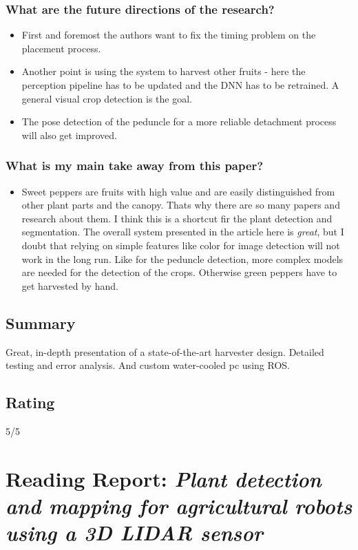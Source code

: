     \subsubsection*{What are the future directions of the research?}
    \begin{itemize}
        \item First and foremost the authors want to fix the timing problem on the placement process.
        \item Another point is using the system to harvest other fruits - here the perception pipeline has to be updated and the DNN has to be retrained. A general visual crop detection is the goal.
        \item The pose detection of the peduncle for a more reliable detachment process will also get improved.
    \end{itemize}
    \subsubsection*{What is my main take away from this paper?}
    \begin{itemize}
        \item Sweet peppers are fruits with high value and are easily distinguished from other plant parts and the canopy. Thats why there are so many papers and research about them. I think this is a shortcut fir the plant detection and segmentation. The overall system presented in the article here is \emph{great}, but I doubt that relying on simple features like color for image detection will not work in the long run. Like for the peduncle detection, more complex models are needed for the detection of the crops. Otherwise green peppers have to get harvested by hand.
    \end{itemize}
    
    \subsection*{Summary}
    Great, in-depth presentation of a state-of-the-art harvester design. Detailed testing and error analysis. And custom water-cooled pc using ROS.
    \subsection*{Rating}
    5/5
    
    
    
    \newpage
    
    \section{Reading Report: \emph{Plant detection and mapping for agricultural robots using a 3D LIDAR sensor}}
    \cite{Weiss2011}
    
